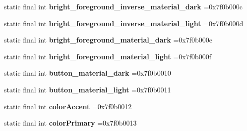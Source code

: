 \begin{DoxyCompactItemize}
\item 
\hypertarget{classcheck_1_1test_1_1_r_1_1color_a2c75b33d84eafc4b2e13b55dfc511734}{}static final int {\bfseries bright\+\_\+foreground\+\_\+inverse\+\_\+material\+\_\+dark} =0x7f0b000c\label{classcheck_1_1test_1_1_r_1_1color_a2c75b33d84eafc4b2e13b55dfc511734}

\item 
\hypertarget{classcheck_1_1test_1_1_r_1_1color_a5e66f80b1e0dcab5f338d3b83e0b99f4}{}static final int {\bfseries bright\+\_\+foreground\+\_\+inverse\+\_\+material\+\_\+light} =0x7f0b000d\label{classcheck_1_1test_1_1_r_1_1color_a5e66f80b1e0dcab5f338d3b83e0b99f4}

\item 
\hypertarget{classcheck_1_1test_1_1_r_1_1color_aaba23cb8aec886a2413943ec55df2206}{}static final int {\bfseries bright\+\_\+foreground\+\_\+material\+\_\+dark} =0x7f0b000e\label{classcheck_1_1test_1_1_r_1_1color_aaba23cb8aec886a2413943ec55df2206}

\item 
\hypertarget{classcheck_1_1test_1_1_r_1_1color_acd2457ae2761d31ed3122a52dace4dcc}{}static final int {\bfseries bright\+\_\+foreground\+\_\+material\+\_\+light} =0x7f0b000f\label{classcheck_1_1test_1_1_r_1_1color_acd2457ae2761d31ed3122a52dace4dcc}

\item 
\hypertarget{classcheck_1_1test_1_1_r_1_1color_a743a6f1ce30b3606233fb15581ba8222}{}static final int {\bfseries button\+\_\+material\+\_\+dark} =0x7f0b0010\label{classcheck_1_1test_1_1_r_1_1color_a743a6f1ce30b3606233fb15581ba8222}

\item 
\hypertarget{classcheck_1_1test_1_1_r_1_1color_ae0a97a81cefb23af8657f11b5b1049f4}{}static final int {\bfseries button\+\_\+material\+\_\+light} =0x7f0b0011\label{classcheck_1_1test_1_1_r_1_1color_ae0a97a81cefb23af8657f11b5b1049f4}

\item 
\hypertarget{classcheck_1_1test_1_1_r_1_1color_ae9605ffa8e0dc9cc9e95edcb1bfebc32}{}static final int {\bfseries color\+Accent} =0x7f0b0012\label{classcheck_1_1test_1_1_r_1_1color_ae9605ffa8e0dc9cc9e95edcb1bfebc32}

\item 
\hypertarget{classcheck_1_1test_1_1_r_1_1color_ae61ba96837b6276ae964e38aa213da5f}{}static final int {\bfseries color\+Primary} =0x7f0b0013\label{classcheck_1_1test_1_1_r_1_1color_ae61ba96837b6276ae964e38aa213da5f}


\end{DoxyCompactItemize}
